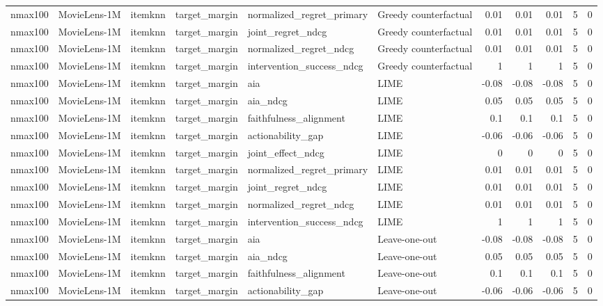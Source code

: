 \begin{table}[t]
{\begin{tabular}{llllllrrrrr}
nmax100 & MovieLens-1M & itemknn & target\_margin & normalized\_regret\_primary & Greedy counterfactual & 0.01 & 0.01 & 0.01 & 5 & 0 \\
nmax100 & MovieLens-1M & itemknn & target\_margin & joint\_regret\_ndcg & Greedy counterfactual & 0.01 & 0.01 & 0.01 & 5 & 0 \\
nmax100 & MovieLens-1M & itemknn & target\_margin & normalized\_regret\_ndcg & Greedy counterfactual & 0.01 & 0.01 & 0.01 & 5 & 0 \\
nmax100 & MovieLens-1M & itemknn & target\_margin & intervention\_success\_ndcg & Greedy counterfactual & 1 & 1 & 1 & 5 & 0 \\
nmax100 & MovieLens-1M & itemknn & target\_margin & aia & LIME & -0.08 & -0.08 & -0.08 & 5 & 0 \\
nmax100 & MovieLens-1M & itemknn & target\_margin & aia\_ndcg & LIME & 0.05 & 0.05 & 0.05 & 5 & 0 \\
nmax100 & MovieLens-1M & itemknn & target\_margin & faithfulness\_alignment & LIME & 0.1 & 0.1 & 0.1 & 5 & 0 \\
nmax100 & MovieLens-1M & itemknn & target\_margin & actionability\_gap & LIME & -0.06 & -0.06 & -0.06 & 5 & 0 \\
nmax100 & MovieLens-1M & itemknn & target\_margin & joint\_effect\_ndcg & LIME & 0 & 0 & 0 & 5 & 0 \\
nmax100 & MovieLens-1M & itemknn & target\_margin & normalized\_regret\_primary & LIME & 0.01 & 0.01 & 0.01 & 5 & 0 \\
nmax100 & MovieLens-1M & itemknn & target\_margin & joint\_regret\_ndcg & LIME & 0.01 & 0.01 & 0.01 & 5 & 0 \\
nmax100 & MovieLens-1M & itemknn & target\_margin & normalized\_regret\_ndcg & LIME & 0.01 & 0.01 & 0.01 & 5 & 0 \\
nmax100 & MovieLens-1M & itemknn & target\_margin & intervention\_success\_ndcg & LIME & 1 & 1 & 1 & 5 & 0 \\
nmax100 & MovieLens-1M & itemknn & target\_margin & aia & Leave-one-out & -0.08 & -0.08 & -0.08 & 5 & 0 \\
nmax100 & MovieLens-1M & itemknn & target\_margin & aia\_ndcg & Leave-one-out & 0.05 & 0.05 & 0.05 & 5 & 0 \\
nmax100 & MovieLens-1M & itemknn & target\_margin & faithfulness\_alignment & Leave-one-out & 0.1 & 0.1 & 0.1 & 5 & 0 \\
nmax100 & MovieLens-1M & itemknn & target\_margin & actionability\_gap & Leave-one-out & -0.06 & -0.06 & -0.06 & 5 & 0 \\

\end{tabular}}
\end{table}
